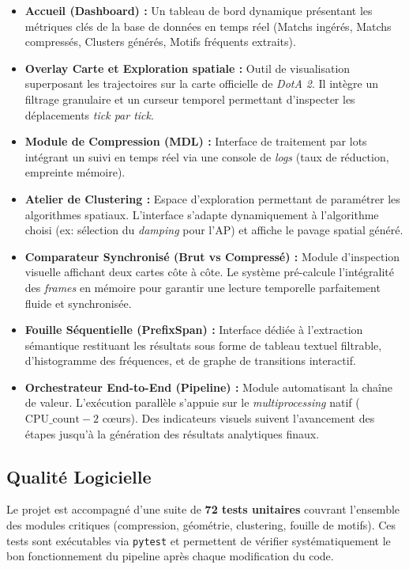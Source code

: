 \documentclass[11pt, a4paper]{article}
\begin{document}
\begin{itemize}
    \item \textbf{Accueil (Dashboard) :} Un tableau de bord dynamique présentant les métriques clés de la base de données en temps réel (Matchs ingérés, Matchs compressés, Clusters générés, Motifs fréquents extraits).
    
    \item \textbf{Overlay Carte et Exploration spatiale :} Outil de visualisation superposant les trajectoires sur la carte officielle de \textit{DotA 2}. Il intègre un filtrage granulaire et un curseur temporel permettant d'inspecter les déplacements \textit{tick par tick}.
    
    \item \textbf{Module de Compression (MDL) :} Interface de traitement par lots intégrant un suivi en temps réel via une console de \textit{logs} (taux de réduction, empreinte mémoire).
    
    \item \textbf{Atelier de Clustering :} Espace d'exploration permettant de paramétrer les algorithmes spatiaux. L'interface s'adapte dynamiquement à l'algorithme choisi (ex: sélection du \textit{damping} pour l'AP) et affiche le pavage spatial généré.
    
    \item \textbf{Comparateur Synchronisé (Brut vs Compressé) :} Module d'inspection visuelle affichant deux cartes côte à côte. Le système pré-calcule l'intégralité des \textit{frames} en mémoire pour garantir une lecture temporelle parfaitement fluide et synchronisée.
    
    \item \textbf{Fouille Séquentielle (PrefixSpan) :} Interface dédiée à l'extraction sémantique restituant les résultats sous forme de tableau textuel filtrable, d'histogramme des fréquences, et de graphe de transitions interactif.
    
    \item \textbf{Orchestrateur End-to-End (Pipeline) :} Module automatisant la chaîne de valeur. L'exécution parallèle s'appuie sur le \textit{multiprocessing} natif ($\text{CPU\_count} - 2$ cœurs). Des indicateurs visuels suivent l'avancement des étapes jusqu'à la génération des résultats analytiques finaux.
\end{itemize}

\subsection{Qualité Logicielle}
Le projet est accompagné d'une suite de \textbf{72 tests unitaires} couvrant l'ensemble des modules critiques (compression, géométrie, clustering, fouille de motifs). Ces tests sont exécutables via \texttt{pytest} et permettent de vérifier systématiquement le bon fonctionnement du pipeline après chaque modification du code.
\end{document}
